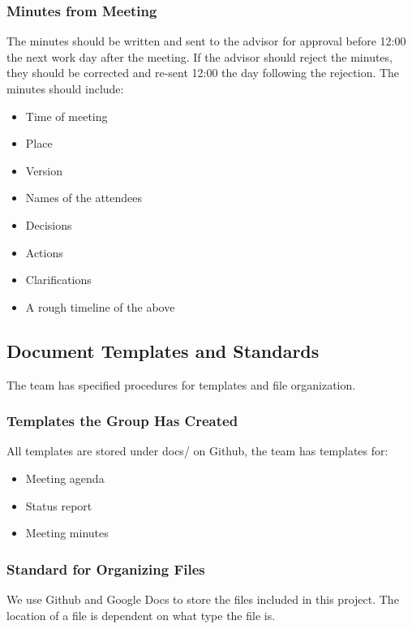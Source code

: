 \subsubsection{Minutes from Meeting}
The minutes should be written and sent to the advisor for approval before 12:00 the next work day after the meeting. If the advisor should reject the minutes, they should be corrected and re-sent 12:00 the day following the rejection. The minutes should include:
\begin{itemize}
	\item Time of meeting
	\item Place
	\item Version
	\item Names of the attendees
	\item Decisions
	\item Actions
	\item Clarifications
	\item A rough timeline of the above
\end{itemize}

\subsection{Document Templates and Standards}
The team has specified procedures for templates and file organization.

\subsubsection{Templates the Group Has Created}
All templates are stored under docs/ on Github, the team has templates for:

\begin{itemize}
	\item Meeting agenda
	\item Status report
	\item Meeting minutes
\end{itemize}

\subsubsection{Standard for Organizing Files}
We use Github and Google Docs to store the files included in this project. The
location of a file is dependent on what type the file is. 

